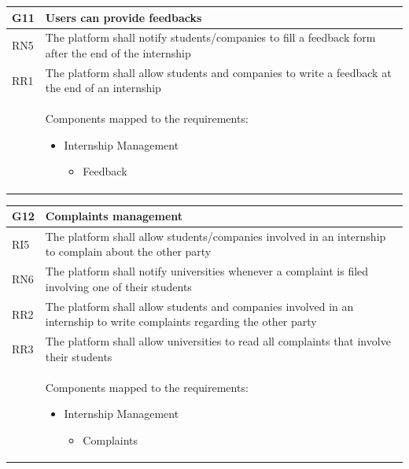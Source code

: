 \documentclass[11pt,twoside]{article}
\begin{document}
\begin{table}[H]
\begin{tabular}{| p{} | p{} |}
\hline
\rowcolor{Gray1}
\textbf{G11} & \textbf{Users can provide feedbacks} \\
\hline
\rowcolor{Gray2}
RN5 & The platform shall notify students/companies to fill a feedback form after the end of the internship \\
\hline
\rowcolor{Gray2}
RR1 & The platform shall allow students and companies to write a feedback at the end of an internship \\
\hline
 & Components mapped to the requirements:
\begin{itemize}
\item Internship Management
 	\begin{itemize}
 	\item Feedback
 	\end{itemize}
\end{itemize} \\
\hline
\end{tabular}
\end{table}

\newpage

\begin{table}[H]
\begin{tabular}{| p{} | p{} |}
\hline
\rowcolor{Gray1}
\textbf{G12} & \textbf{Complaints management} \\
\hline
\rowcolor{Gray2}
RI5 & The platform shall allow students/companies involved in an internship to complain about the other party \\
\hline
\rowcolor{Gray2}
RN6 & The platform shall notify universities whenever a complaint is filed involving one of their students \\
\hline
\rowcolor{Gray2}
RR2 & The platform shall allow students and companies involved in an internship to write complaints regarding the other party \\
\hline
\rowcolor{Gray2}
RR3 & The platform shall allow universities to read all complaints that involve their students \\
\hline
 & Components mapped to the requirements:
\begin{itemize}
\item Internship Management
 	\begin{itemize}
 	\item Complaints
 	\end{itemize}
\end{itemize} \\
\hline
\end{tabular}
\end{table}
\end{document}
